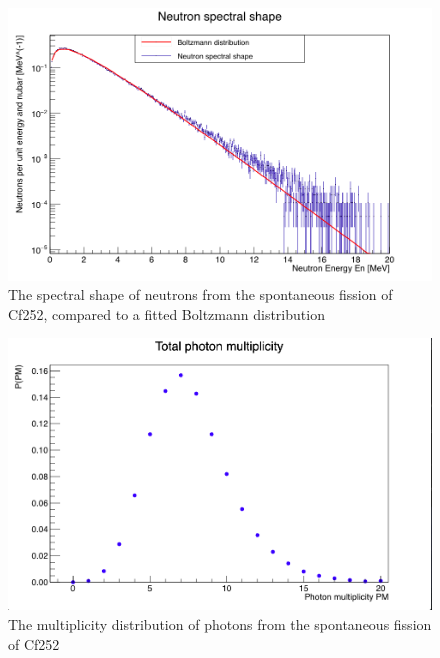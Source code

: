 \documentclass[]{article}
\begin{document}
\begin{figure} [H]
	\centering
	\includegraphics[scale=0.36]{Cf252_sf_neutron_spectral_shape.png}
	\caption{The spectral shape of neutrons from the spontaneous fission of Cf252, compared to a fitted Boltzmann distribution}
	\label{fig:Cf252_sf_neutron_spectral_shape}
\end{figure}

\begin{figure} [H]
	\centering
	\includegraphics[scale=0.36]{Cf252_sf_total_ph_mult.png}
	\caption{The multiplicity distribution of photons from the spontaneous fission of Cf252}
	\label{fig:Cf252_sf_total_ph_mult}
\end{figure}
\end{document}
